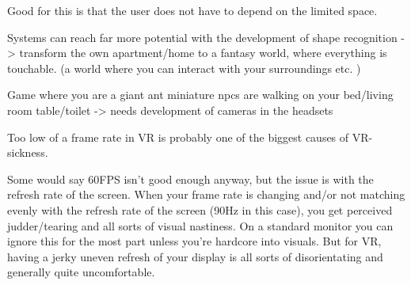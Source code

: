 Good for this is that the user does not have to depend on the limited space.

Systems can reach far more potential with the development of shape recognition -> transform the own apartment/home to a fantasy world, where everything is touchable. (a world where you can interact with your surroundings etc. )

Game where you are a giant ant miniature npcs are walking on your bed/living room table/toilet -> needs development of cameras in the headsets



Too low of a frame rate in VR is probably one of the biggest causes of VR-sickness.

Some would say 60FPS isn't good enough anyway, but the issue is with the refresh rate of the screen. When your frame rate is changing and/or not matching evenly with the refresh rate of the screen (90Hz in this case), you get perceived judder/tearing and all sorts of visual nastiness. On a standard monitor you can ignore this for the most part unless you're hardcore into visuals. But for VR, having a jerky uneven refresh of your display is all sorts of disorientating and generally quite uncomfortable.

